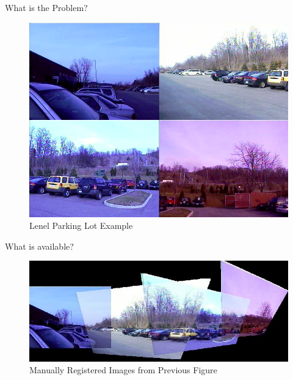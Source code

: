 \documentclass[serif]{beamer}
\begin{document}
\begin{frame}[c]{\sc What is the Problem?}

\begin{center}

\begin{figure}[!h]
\centering
\includegraphics[width=.8\columnwidth]{LenelExample}
\caption{Lenel Parking Lot Example}
\label{LenelExample}
\end{figure}

\end{center}

\end{frame}



\begin{frame}[t]{\sc What is available?}

\begin{center}

\begin{figure}[!h]
\centering
\vfill
\includegraphics[width=1\columnwidth]{LenelExampleStitched}
\caption{Manually Registered Images from Previous Figure}
\label{LenelExampleStitched}
\end{figure}

\end{center}

\end{frame}
\end{document}
